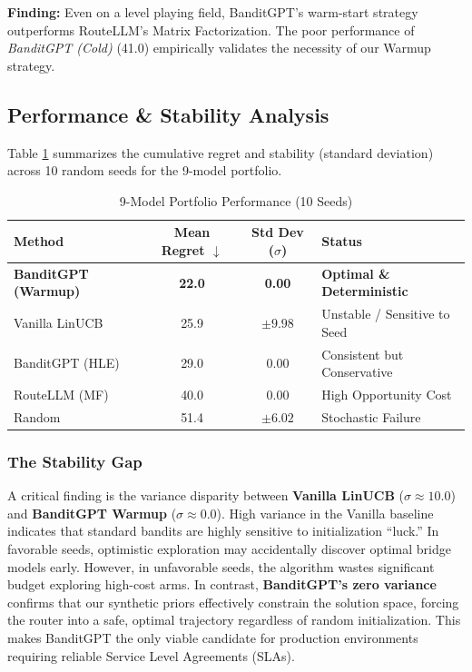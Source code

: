 \documentclass[sigconf]{acmart}
\begin{document}
\textbf{Finding:} Even on a level playing field, BanditGPT's warm-start strategy outperforms RouteLLM's Matrix Factorization. The poor performance of \textit{BanditGPT (Cold)} (41.0) empirically validates the necessity of our Warmup strategy.

\subsection{Performance & Stability Analysis}
Table \ref{tab:final_results} summarizes the cumulative regret and stability (standard deviation) across 10 random seeds for the 9-model portfolio.

\begin{table}[h]
\centering
\caption{9-Model Portfolio Performance (10 Seeds)}
\label{tab:final_results}
\begin{tabular}{l c c l}
\toprule
\textbf{Method} & \textbf{Mean Regret} $\downarrow$ & \textbf{Std Dev} ($\sigma$) & \textbf{Status} \\
\midrule
\textbf{BanditGPT (Warmup)} & \textbf{22.0} & \textbf{0.00} & \textbf{Optimal \& Deterministic} \\
Vanilla LinUCB & 25.9 & $\pm 9.98$ & Unstable / Sensitive to Seed \\
BanditGPT (HLE) & 29.0 & $0.00$ & Consistent but Conservative \\
RouteLLM (MF) & 40.0 & $0.00$ & High Opportunity Cost \\
Random & 51.4 & $\pm 6.02$ & Stochastic Failure \\
\bottomrule
\end{tabular}
\end{table}

\subsubsection{The Stability Gap}
A critical finding is the variance disparity between \textbf{Vanilla LinUCB} ($\sigma \approx 10.0$) and \textbf{BanditGPT Warmup} ($\sigma \approx 0.0$).
High variance in the Vanilla baseline indicates that standard bandits are highly sensitive to initialization ``luck.'' In favorable seeds, optimistic exploration may accidentally discover optimal bridge models early. However, in unfavorable seeds, the algorithm wastes significant budget exploring high-cost arms.
In contrast, \textbf{BanditGPT's zero variance} confirms that our synthetic priors effectively constrain the solution space, forcing the router into a safe, optimal trajectory regardless of random initialization. This makes BanditGPT the only viable candidate for production environments requiring reliable Service Level Agreements (SLAs).
\end{document}
